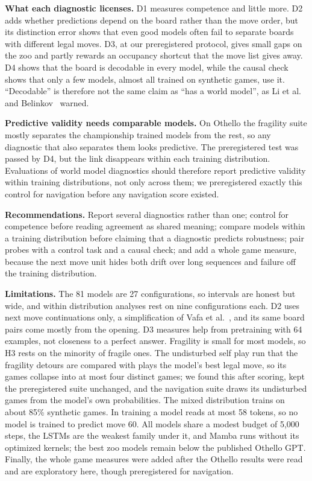 \documentclass[journal]{IEEEtran}
\begin{document}
\textbf{What each diagnostic licenses.} D1 measures competence and little more. D2 adds whether predictions depend
on the board rather than the move order, but its distinction error shows that even good models often fail to
separate boards with different legal moves. D3, at our preregistered protocol, gives small gaps on the zoo and
partly rewards an occupancy shortcut that the move list gives away. D4 shows that the board is decodable in every
model, while the causal check shows that only a few models, almost all trained on synthetic games, use it.
``Decodable'' is therefore not the same claim as ``has a world model'', as Li et al.~\cite{li2023othello} and
Belinkov~\cite{belinkov2022probing} warned.

\textbf{Predictive validity needs comparable models.} On Othello the fragility suite mostly separates the
championship trained models from the rest, so any diagnostic that also separates them looks predictive. The
preregistered test was passed by D4, but the link disappears within each training distribution. Evaluations of
world model diagnostics should therefore report predictive validity within training distributions, not only across
them; we preregistered exactly this control for navigation before any navigation score existed.

\textbf{Recommendations.} Report several diagnostics rather than one; control for competence before reading
agreement as shared meaning; compare models within a training distribution before claiming that a diagnostic
predicts robustness; pair probes with a control task and a causal check; and add a whole game measure, because the
next move unit hides both drift over long sequences and failure off the training distribution.

\textbf{Limitations.} The 81 models are 27 configurations, so intervals are honest but wide, and within distribution
analyses rest on nine configurations each. D2 uses next move continuations only, a simplification of Vafa et
al.~\cite{vafa2024evaluating}, and its same board pairs come mostly from the opening. D3 measures help from
pretraining with 64 examples, not closeness to a perfect answer. Fragility is small for most models, so H3 rests on
the minority of fragile ones. The undisturbed self play run that the fragility detours are compared with plays the
model's best legal move, so its games collapse into at most four distinct games; we found this after scoring, kept
the preregistered suite unchanged, and the navigation suite draws its undisturbed games from the model's own
probabilities. The mixed distribution trains on about 85\% synthetic games. In training a model reads at most 58
tokens, so no model is trained to predict move 60. All models share a modest budget of 5,000 steps, the LSTMs are
the weakest family under it, and Mamba runs without its optimized kernels; the best zoo models remain below the
published Othello GPT. Finally, the whole game measures were added after the Othello results were read and are
exploratory here, though preregistered for navigation.
\end{document}
